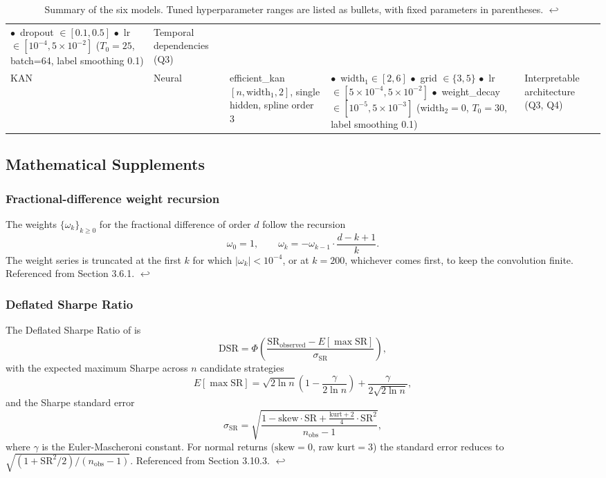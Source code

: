 \documentclass[12pt,a4paper,oneside]{article}
\begin{document}
\begin{table}[H]
\begin{tabular}{p{1.5cm}p{1.7cm}p{2.3cm}p{5.0cm}p{2.0cm}}
$\bullet$\ dropout $\in [0.1, 0.5]$ \newline
$\bullet$\ lr $\in [10^{-4}, 5 \times 10^{-2}]$ \newline
($T_0=25$, batch=64, label smoothing 0.1)
& Temporal dependencies (Q3) \\
KAN & Neural & efficient\_kan $[n, \text{width}_1, 2]$, single hidden, spline order 3 &
$\bullet$\ width$_1 \in [2, 6]$ \newline
$\bullet$\ grid $\in \{3, 5\}$ \newline
$\bullet$\ lr $\in [5 \times 10^{-4}, 5 \times 10^{-2}]$ \newline
$\bullet$\ weight\_decay $\in [10^{-5}, 5 \times 10^{-3}]$ \newline
(width$_2=0$, $T_0=30$, label smoothing 0.1)
& Interpretable architecture (Q3, Q4) \\
\bottomrule
\end{tabular}
\caption{Summary of the six models. Tuned hyperparameter ranges are listed as bullets, with fixed parameters in parentheses. \hyperref[ref:model_summary_call]{$\hookleftarrow$}}
\label{tab:model_summary}
\end{table}


\subsection{Mathematical Supplements}\label{app:math}

\subsubsection{Fractional-difference weight recursion}\label{app:ffd_weights}
The weights $\{\omega_k\}_{k \geq 0}$ for the fractional difference of order $d$ follow the recursion
\[
\omega_0 = 1, \qquad \omega_k = -\omega_{k-1} \cdot \frac{d - k + 1}{k}.
\]
The weight series is truncated at the first $k$ for which $|\omega_k| < 10^{-4}$, or at $k = 200$, whichever comes first, to keep the convolution finite. Referenced from Section 3.6.1. \hyperref[ref:ffd_weights_call]{$\hookleftarrow$}


\subsubsection{Deflated Sharpe Ratio}\label{app:dsr_formula}
The Deflated Sharpe Ratio of \citet[Chapter 11]{lopez_de_prado_2018} is
\[
\text{DSR} = \Phi\!\left(\frac{\text{SR}_{\text{observed}} - E[\max \text{SR}]}{\sigma_{\text{SR}}}\right),
\]
with the expected maximum Sharpe across $n$ candidate strategies
\[
E[\max \text{SR}] = \sqrt{2 \ln n}\left(1 - \frac{\gamma}{2 \ln n}\right) + \frac{\gamma}{2\sqrt{2 \ln n}},
\]
and the Sharpe standard error
\[
\sigma_{\text{SR}} = \sqrt{\frac{1 - \text{skew} \cdot \text{SR} + \tfrac{\text{kurt} + 2}{4} \cdot \text{SR}^2}{n_{\text{obs}} - 1}},
\]
where $\gamma$ is the Euler-Mascheroni constant. For normal returns ($\text{skew} = 0$, raw $\text{kurt} = 3$) the standard error reduces to $\sqrt{(1 + \text{SR}^2 / 2) / (n_{\text{obs}} - 1)}$. Referenced from Section 3.10.3. \hyperref[ref:dsr_formula_call]{$\hookleftarrow$}
\end{document}
